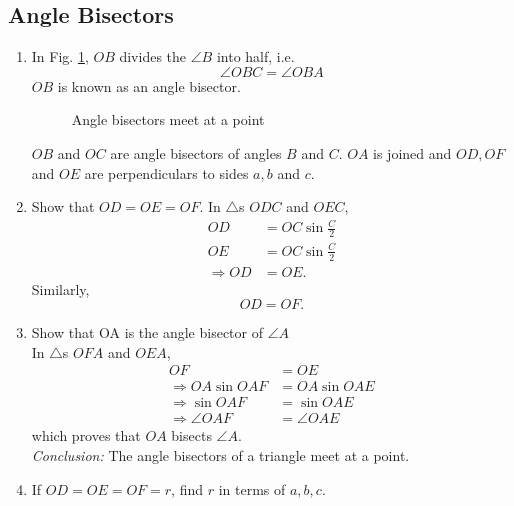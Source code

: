 \subsection{Angle Bisectors}
\renewcommand{\theequation}{\theenumi}
\begin{enumerate}[label=\arabic*.,ref=\thesubsection.\theenumi]
\item
	In Fig. \ref{ch3_angle_bisector}, $OB$ divides the  $\angle B$ into half, i.e.\begin{equation}
	\angle OBC = \angle OBA
	\end{equation}
	$OB$ is known as an angle bisector.


\begin{figure}[!ht]
	\begin{center}
		
		\resizebox{\columnwidth}{!}{}
	\end{center}
	\caption{Angle bisectors meet at a point}
	\label{ch3_angle_bisector}	
\end{figure}

	$OB$ and $OC$ are angle bisectors of angles $B$ and $C$. $OA$ is joined and $OD, OF$ and $OE$ are perpendiculars to sides $a,b$ and $c$.
\item
  Show that $OD = OE = OF$.
\solution In $\triangle$s $ODC$ and $OEC$,
\begin{align}
OD &= OC \sin \frac{C}{2}
\\
OE &= OC \sin \frac{C}{2} 
\\
\Rightarrow OD &=OE.
\end{align}
Similarly,
\begin{equation}
OD = OF.
\end{equation}
%
\item
	Show that OA is the angle bisector of $\angle A$
\\
\solution In $\triangle$s $OFA$ and $OEA$,
\begin{align}
OF &= OE
\\
\Rightarrow OA \sin OAF &= OA \sin OAE \\
\Rightarrow \sin OAF &=  \sin OAE \\
\Rightarrow \angle OAF &= \angle OAE
\end{align}
which proves that $OA$ bisects $\angle A$.
\\
{\em Conclusion:} The angle bisectors of a triangle meet at a point.
\item If $OD=OE=OF=r$, find $r$ in terms of $a,b,c$.
\end{enumerate}
